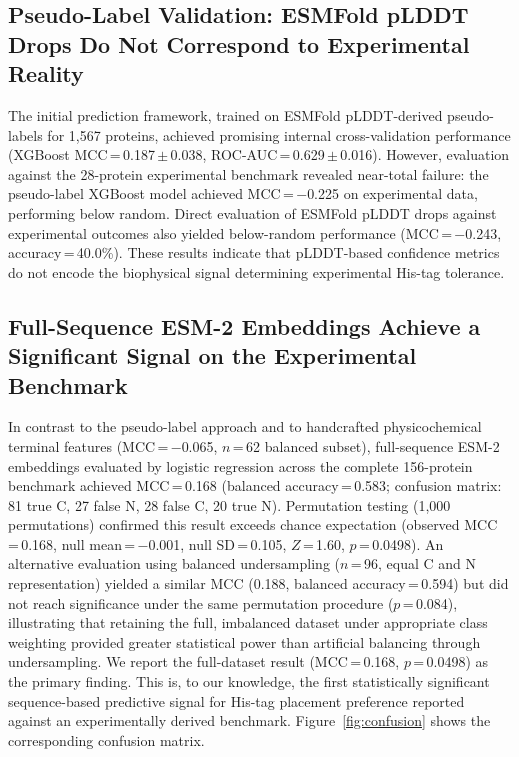 \documentclass[unnumsec,webpdf,contemporary,large]{oup-authoring-template}
\begin{document}
\subsection{Pseudo-Label Validation: ESMFold pLDDT Drops Do Not Correspond to Experimental Reality}
The initial prediction framework, trained on ESMFold pLDDT-derived pseudo-labels for 1,567 proteins, achieved promising internal cross-validation performance (XGBoost MCC\,=\,0.187\,$\pm$\,0.038, ROC-AUC\,=\,0.629\,$\pm$\,0.016). However, evaluation against the 28-protein experimental benchmark revealed near-total failure: the pseudo-label XGBoost model achieved MCC\,=\,$-$0.225 on experimental data, performing below random. Direct evaluation of ESMFold pLDDT drops against experimental outcomes also yielded below-random performance (MCC\,=\,$-$0.243, accuracy\,=\,40.0\%). These results indicate that pLDDT-based confidence metrics do not encode the biophysical signal determining experimental His-tag tolerance.

\subsection{Full-Sequence ESM-2 Embeddings Achieve a Significant Signal on the Experimental Benchmark}
In contrast to the pseudo-label approach and to handcrafted physicochemical terminal features (MCC\,=\,$-$0.065, $n$\,=\,62 balanced subset), full-sequence ESM-2 embeddings evaluated by logistic regression across the complete 156-protein benchmark achieved MCC\,=\,0.168 (balanced accuracy\,=\,0.583; confusion matrix: 81 true C, 27 false N, 28 false C, 20 true N). Permutation testing (1,000 permutations) confirmed this result exceeds chance expectation (observed MCC\,=\,0.168, null mean\,=\,$-$0.001, null SD\,=\,0.105, $Z$\,=\,1.60, $p$\,=\,0.0498). An alternative evaluation using balanced undersampling ($n$\,=\,96, equal C and N representation) yielded a similar MCC (0.188, balanced accuracy\,=\,0.594) but did not reach significance under the same permutation procedure ($p$\,=\,0.084), illustrating that retaining the full, imbalanced dataset under appropriate class weighting provided greater statistical power than artificial balancing through undersampling. We report the full-dataset result (MCC\,=\,0.168, $p$\,=\,0.0498) as the primary finding. This is, to our knowledge, the first statistically significant sequence-based predictive signal for His-tag placement preference reported against an experimentally derived benchmark. Figure~\ref{fig:confusion} shows the corresponding confusion matrix.
\end{document}
